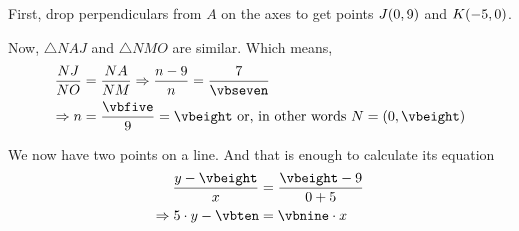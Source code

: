 \begin{solution}[\halfpage]
	First, drop perpendiculars from $A$ on the axes to get points $J(0,9)$ and $K(-5,0)$. 
	
	Now, $\bigtriangleup NAJ$ and $\bigtriangleup NMO$ are similar. Which means, 
	\begin{align}
		\dfrac{NJ}{NO} &= \dfrac{NA}{NM} \Rightarrow \dfrac{n-\vbtwo}{n} = \dfrac{\vbthree}{\vbseven} \\
		\Rightarrow n &= \dfrac{\vbfive}{\vbfour} = \vbeight \text{ or, in other words } N = (0, \vbeight)
	\end{align}
	
	\gcalcexpr[0]{\vbnine}{\vbeight - \vbtwo}
	\gcalcexpr[0]{\vbten}{\vbeight * \vbone }
	
	We now have two points on a line. And that is enough to calculate its equation
	\begin{align}
		\dfrac{y-\vbeight}{x} &= \dfrac{\vbeight - \vbtwo}{0 + \vbone} \\
		\Rightarrow \vbone\cdot y - \vbten &= \vbnine\cdot x
	\end{align}
	
\end{solution}
